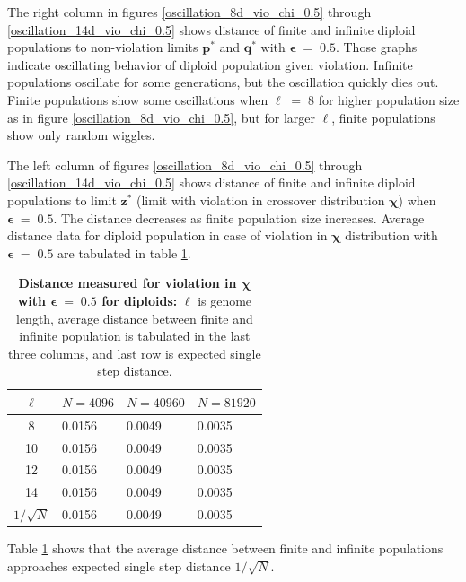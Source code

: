 \clearpage

The right column in figures \ref{oscillation_8d_vio_chi_0.5} through \ref{oscillation_14d_vio_chi_0.5} 
shows distance of finite and infinite diploid populations to non-violation limits $\bm{p^\ast}$ and $\bm{q^\ast}$ with $\bm{\epsilon} \;=\; 0.5$. 
Those graphs indicate oscillating behavior of diploid population given violation. 
Infinite populations oscillate for some generations, but the oscillation quickly dies out. 
Finite populations show some oscillations when $\ell \;=\; 8$ for higher population size as in figure \ref{oscillation_8d_vio_chi_0.5}, but 
for larger $\ell$, finite populations show only random wiggles. 

The left column of figures \ref{oscillation_8d_vio_chi_0.5} through \ref{oscillation_14d_vio_chi_0.5} 
shows distance of finite and infinite diploid populations to limit $\bm{z^\ast}$ 
(limit with violation in crossover distribution $\bm{\chi}$) when $\bm{\epsilon} \;=\; 0.5$. 
The distance decreases as finite population size increases.
Average distance data for diploid population in case of violation in $\bm{\chi}$ distribution 
with $\bm{\epsilon} \;=\; 0.5$ are tabulated in table \ref{distanceChiDipEps0.5}.

\begin{table}[h]
\caption[\textbf{Distance measured for violation in $\bm{\chi}$ with $\bm{\epsilon} \;=\; 0.5$ for diploids}]{\textbf{Distance measured for violation in $\bm{\chi}$ with $\bm{\epsilon} \;=\; 0.5$ for diploids:} $\ell$ is genome length, 
average distance between finite and infinite population is tabulated in the last three columns, and last row is expected single step distance.}
\centering
\begin{tabularx}{0.75\textwidth}{ c *{3}{X}}
\toprule
$\ell$ & $N = 4096$ & $N = 40960$ & $N = 81920$  \\
\midrule
8 & 0.0156	&  0.0049	& 0.0035 \\	
10 & 0.0156	&  0.0049	& 0.0035 \\
12 & 0.0156	&  0.0049	& 0.0035 \\
14 & 0.0156	&  0.0049	& 0.0035 \\
\midrule
$1/\sqrt{N}$ & 0.0156 & 0.0049 & 0.0035 \\
\bottomrule
\end{tabularx}
\label{distanceChiDipEps0.5}
\end{table} 

Table \ref{distanceChiDipEps0.5} shows that the average distance 
between finite and infinite populations approaches expected single step distance $1/\sqrt{N}$. 
 
